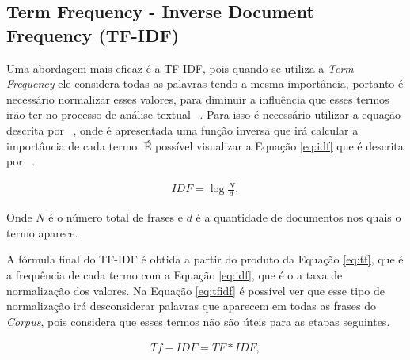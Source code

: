             \subsection{Term Frequency - Inverse Document Frequency (TF-IDF)}
            \label{sec:tfidf}
               Uma abordagem mais eficaz é a TF-IDF, pois quando se utiliza a \textit{Term Frequency} ele considera todas as palavras 
               tendo a mesma importância, portanto é necessário normalizar esses valores, para diminuir a influência que esses termos irão 
               ter no processo de análise textual ~\cite{sparck1972statistical}. Para isso é necessário utilizar a equação descrita por ~\cite{sparck1972statistical},
               onde é apresentada uma função inversa que irá calcular a importância de cada termo. É possível visualizar a Equação \ref{eq:idf} que é descrita por
               ~\cite{sparck1972statistical}.
               

               \begin{equation}\label{eq:idf}
                \begin{aligned}
                  IDF = \log \frac{N}{d},
              \end{aligned} 
              \end{equation}
               
              Onde $N$ é o número total de frases e $d$ é a quantidade de documentos nos quais o termo aparece.


              A fórmula final do TF-IDF é obtida a partir do produto da Equação \ref{eq:tf}, que é a frequência de cada termo com a Equação \ref{eq:idf}, 
              que é o a taxa de normalização dos valores. Na Equação \ref{eq:tfidf} é possível ver que esse tipo de normalização irá desconsiderar 
              palavras que aparecem em todas as frases do \textit{Corpus}, pois considera que esses termos não são úteis para as etapas seguintes.
              

              \begin{equation}\label{eq:tfidf}
                \begin{aligned}
                  Tf-IDF = TF*IDF,
              \end{aligned} 
              \end{equation}
               


